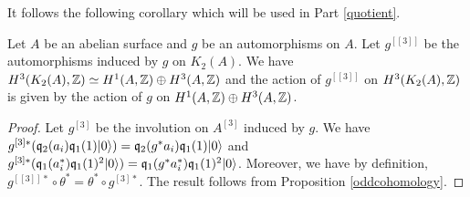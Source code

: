 It follows the following corollary which will be used in Part \ref{quotient}.
\begin{cor}\label{actionH3}
Let $A$ be an abelian surface and $g$ be an automorphisms on $A$. Let $g^{[[3]]}$ be the automorphisms induced by $g$ on $K_2(A)$.
We have $H^3(K_2(A),\mathbb{Z})\simeq H^1(A,\mathbb{Z})\oplus H^3(A,\mathbb{Z})$ and the action of $g^{[[3]]}$ on $H^3(K_2(A),\mathbb{Z})$ is given by the action of $g$ on $H^1(A,\mathbb{Z})\oplus H^3(A,\mathbb{Z})$.
\end{cor}
\begin{proof}
Let $g^{[3]}$ be the involution on $A^{[3]}$ induced by $g$.
We have $g^{[3]*}(\mathfrak{q}_2(a_i)\mathfrak{q}_1(1)|0\rangle)=\mathfrak{q}_2(g^{*}a_i)\mathfrak{q}_1(1)|0\rangle$ and $g^{[3]*}(\mathfrak{q}_1(a^*_i)\mathfrak{q}_1(1)^2|0\rangle)=\mathfrak{q}_1(g^{*}a^*_i)\mathfrak{q}_1(1)^2|0\rangle$.
Moreover, we have by definition, $g^{[[3]]*}\circ \theta^{*}=\theta^{*}\circ g^{[3]*}$.
The result follows from Proposition \ref{oddcohomology}.
\end{proof}
